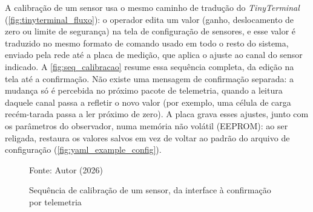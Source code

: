 A calibração de um sensor usa o mesmo caminho de tradução do
\textit{TinyTerminal} (\autoref{fig:tinyterminal_fluxo}): o operador edita
um valor (ganho, deslocamento de zero ou limite de segurança) na tela de
configuração de sensores, e esse valor é traduzido no mesmo formato de
comando usado em todo o resto do sistema, enviado pela rede até a placa
de medição, que aplica o ajuste ao canal do sensor indicado. A
\autoref{fig:seq_calibracao} resume essa sequência completa, da edição na
tela até a confirmação. Não existe uma mensagem de confirmação separada: a
mudança só é percebida no próximo pacote de telemetria, quando a leitura
daquele canal passa a refletir o novo valor (por exemplo, uma célula de
carga recém-tarada passa a ler próximo de zero). A placa grava esses
ajustes, junto com os parâmetros do observador, numa memória não volátil
(EEPROM): ao ser religada, restaura os valores salvos em vez de voltar ao
padrão do arquivo de configuração (\autoref{fig:yaml_example_config}).

\begin{figure}[H]
    \centering
    \caption{Sequência de calibração de um sensor, da interface à confirmação por telemetria}
    \label{fig:seq_calibracao}

    Fonte: Autor (2026)
\end{figure}

